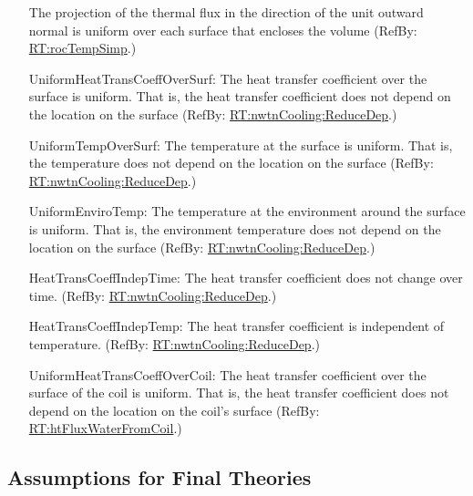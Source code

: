\documentclass[12pt]{article}
\begin{document}
\begin{itemize}
{The projection of the thermal flux in the direction of the unit outward normal
is uniform over each surface that encloses the volume (RefBy:
\hyperref[RT:rocTempSimp]{RT:rocTempSimp}.)}
\item[UniformHeatTransCoeffOverSurf:\phantomsection\label{assumpUnifHeatTransCoeff}]
{The heat transfer coefficient over the surface is uniform.  That is, the heat
transfer coefficient does not depend on the location on the surface (RefBy:
\hyperref[RT:nwtnCooling:ReduceDep]{RT:nwtnCooling:ReduceDep}.)}
\item[UniformTempOverSurf:\phantomsection\label{assumpUnifTempSurf}]
{The temperature at the surface is uniform.  That is, the temperature does not
depend on the location on the surface (RefBy:
\hyperref[RT:nwtnCooling:ReduceDep] {RT:nwtnCooling:ReduceDep}.)}
\item[UniformEnviroTemp:\phantomsection\label{assumpUnifEnviroTempSurf}]
{The temperature at the environment around the surface is uniform.  That is, the
environment temperature does not depend on the location on the surface (RefBy:
\hyperref[RT:nwtnCooling:ReduceDep] {RT:nwtnCooling:ReduceDep}.)}
\item[HeatTransCoeffIndepTime:\phantomsection\label{assumpHeatTransIndepTime}]
{The heat transfer coefficient does not change over time. (RefBy:
\hyperref[RT:nwtnCooling:ReduceDep] {RT:nwtnCooling:ReduceDep}.)}
\item[HeatTransCoeffIndepTemp:\phantomsection\label{assumpHeatTransIndepTemp}]
{The heat transfer coefficient is independent of temperature. (RefBy:
\hyperref[RT:nwtnCooling:ReduceDep] {RT:nwtnCooling:ReduceDep}.)}

\item[UniformHeatTransCoeffOverCoil:\phantomsection\label{assumpUnifHeatTransCoeffCoil}]
{The heat transfer coefficient over the surface of the coil is uniform.  That
is, the heat transfer coefficient does not depend on the location on the coil's
surface (RefBy: \hyperref[RT:htFluxWaterFromCoil]{RT:htFluxWaterFromCoil}.)}

\end{itemize}

\subsection{Assumptions for Final Theories}
\end{document}
